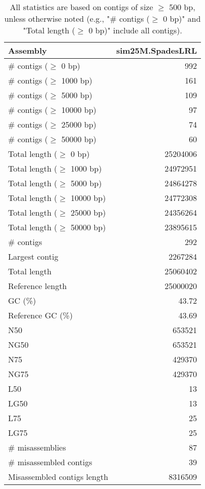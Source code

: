 \documentclass[12pt,a4paper]{article}
\begin{document}
\begin{table}[ht]
\begin{center}
\caption{All statistics are based on contigs of size $\geq$ 500 bp, unless otherwise noted (e.g., "\# contigs ($\geq$ 0 bp)" and "Total length ($\geq$ 0 bp)" include all contigs).}
\begin{tabular}{|l*{1}{|r}|}
\hline
Assembly & sim25M.SpadesLRL \\ \hline
\# contigs ($\geq$ 0 bp) & 992 \\ \hline
\# contigs ($\geq$ 1000 bp) & 161 \\ \hline
\# contigs ($\geq$ 5000 bp) & 109 \\ \hline
\# contigs ($\geq$ 10000 bp) & 97 \\ \hline
\# contigs ($\geq$ 25000 bp) & 74 \\ \hline
\# contigs ($\geq$ 50000 bp) & 60 \\ \hline
Total length ($\geq$ 0 bp) & 25204006 \\ \hline
Total length ($\geq$ 1000 bp) & 24972951 \\ \hline
Total length ($\geq$ 5000 bp) & 24864278 \\ \hline
Total length ($\geq$ 10000 bp) & 24772308 \\ \hline
Total length ($\geq$ 25000 bp) & 24356264 \\ \hline
Total length ($\geq$ 50000 bp) & 23895615 \\ \hline
\# contigs & 292 \\ \hline
Largest contig & 2267284 \\ \hline
Total length & 25060402 \\ \hline
Reference length & 25000020 \\ \hline
GC (\%) & 43.72 \\ \hline
Reference GC (\%) & 43.69 \\ \hline
N50 & 653521 \\ \hline
NG50 & 653521 \\ \hline
N75 & 429370 \\ \hline
NG75 & 429370 \\ \hline
L50 & 13 \\ \hline
LG50 & 13 \\ \hline
L75 & 25 \\ \hline
LG75 & 25 \\ \hline
\# misassemblies & 87 \\ \hline
\# misassembled contigs & 39 \\ \hline
Misassembled contigs length & 8316509 \\ \hline

\end{tabular}
\end{center}
\end{table}
\end{document}
